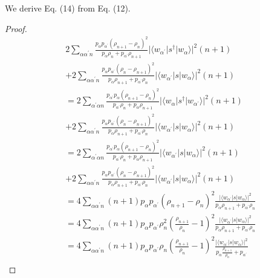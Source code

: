 \documentclass[../../note.tex]{subfiles}
\begin{document}
\begin{lemma}[Eq. (12) to Eq. (14)]
\label{lemma: 12 -> 14}
    We derive Eq. (14) from Eq. (12).
\end{lemma}
\begin{proof}
\begin{align}
    &2 \sum_{\alpha \alpha^\prime n} \frac{p_{\alpha} p_{\alpha^\prime} (\rho_{n+1} - \rho_n)^2}{p_{\alpha} \rho_{n} + p_{\alpha^\prime} \rho_{n+1}} \vert \langle w_{\alpha^\prime} \vert s^\dagger \vert w_{\alpha} \rangle \vert^2 (n+1) \nonumber \\
    &+ 2 \sum_{\alpha \alpha^\prime n} \frac{p_{\alpha} p_{\alpha^\prime} (\rho_{n} - \rho_{n + 1})^2}{p_{\alpha} \rho_{n + 1} + p_{\alpha^\prime} \rho_{n}} \vert \langle w_{\alpha^\prime} \vert s \vert w_{\alpha} \rangle \vert^2 (n + 1) \\
    &= 2 \sum_{ \alpha^\prime \alpha n} \frac{ p_{\alpha^\prime} p_{\alpha} (\rho_{n+1} - \rho_n)^2}{p_{\alpha^\prime} \rho_{n} + p_{\alpha} \rho_{n+1}} \vert \langle w_{\alpha} \vert s^\dagger \vert w_{\alpha^\prime} \rangle \vert^2 (n+1) \nonumber \\
    &+ 2 \sum_{\alpha \alpha^\prime n} \frac{p_{\alpha} p_{\alpha^\prime} (\rho_{n} - \rho_{n + 1})^2}{p_{\alpha} \rho_{n + 1} + p_{\alpha^\prime} \rho_{n}} \vert \langle w_{\alpha^\prime} \vert s \vert w_{\alpha} \rangle \vert^2 (n + 1) \\
    &= 2 \sum_{ \alpha^\prime \alpha n} \frac{ p_{\alpha^\prime} p_{\alpha} (\rho_{n+1} - \rho_n)^2}{p_{\alpha^\prime} \rho_{n} + p_{\alpha} \rho_{n+1}} \vert \langle w_{\alpha^\prime} \vert s \vert w_{\alpha} \rangle \vert^2 (n+1) \nonumber \\
    &+ 2 \sum_{\alpha \alpha^\prime n} \frac{p_{\alpha} p_{\alpha^\prime} (\rho_{n} - \rho_{n + 1})^2}{p_{\alpha} \rho_{n + 1} + p_{\alpha^\prime} \rho_{n}} \vert \langle w_{\alpha^\prime} \vert s \vert w_{\alpha} \rangle \vert^2 (n + 1) \\
    &= 4 \sum_{\alpha \alpha^\prime n} (n+1) p_{\alpha} p_{\alpha^\prime} (\rho_{n+1} - \rho_n)^2 \frac{\vert \langle w_{\alpha^\prime} \vert s \vert w_{\alpha} \rangle \vert^2}{p_{\alpha} \rho_{n+1} + p_{\alpha^\prime} \rho_n} \\
    &= 4 \sum_{\alpha \alpha^\prime n} (n+1) p_{\alpha} p_{\alpha^\prime} \rho_n^2 (\frac{\rho_{n+1}}{\rho_n} - 1)^2 \frac{\vert \langle w_{\alpha^\prime} \vert s \vert w_{\alpha} \rangle \vert^2}{p_{\alpha} \rho_{n+1} + p_{\alpha^\prime} \rho_n} \\
    &= 4 \sum_{\alpha \alpha^\prime n} (n+1) p_{\alpha} p_{\alpha^\prime} \rho_n \left(\frac{\rho_{n+1}}{\rho_n} - 1\right)^2 \frac{\vert \langle w_{\alpha^\prime} \vert s \vert w_{\alpha} \rangle \vert^2}{p_{\alpha} \frac{\rho_{n+1}}{\rho_n} + p_{\alpha^\prime}} \\

\end{align}
\end{proof}
\end{document}
